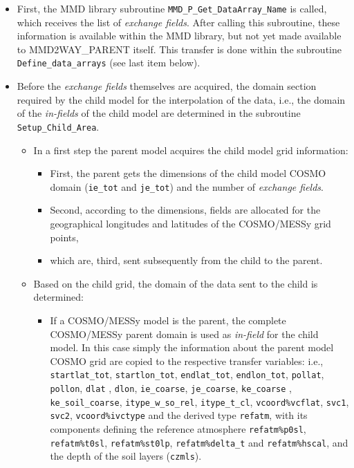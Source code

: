 \documentclass[11pt,twoside]{article}
\begin{document}
\begin{itemize} %

\item First, the MMD library subroutine
\verb|MMD_P_Get_DataArray_Name| is called, which receives the list of {\it 
exchange fields}. After calling this subroutine, these information is
available within the MMD 
library, but not yet made available to MMD2WAY\_PARENT itself. 
This transfer is done within the subroutine \verb|Define_data_arrays| 
(see last item below).

\item
Before the {\it exchange fields} themselves are acquired,
the domain section required by the child model for the interpolation of the
data,  
i.e., the domain of the {\it in-fields} of the child model are determined in the
subroutine \verb|Setup_Child_Area|.
\begin{itemize} %
\item In a first step the parent model acquires the child model grid information:
\begin{itemize} %
\item First, the parent gets the 
dimensions of the child model COSMO domain (\verb|ie_tot| and \verb|je_tot|)
 and the 
 number of {\it exchange fields}.
\item Second, according to the dimensions, fields are allocated for the 
geographical longitudes and latitudes of the COSMO/MESSy grid points,
\item which are, third, sent subsequently from the child to the parent.
\end{itemize} %

\item Based on the child grid, the domain of the data sent to the child
is determined:
\begin{itemize} %
\item If a COSMO/MESSy model is the parent, the complete COSMO/MESSy
parent domain is used as {\it in-field} for the child model. In this
case simply the information about the parent model COSMO grid are copied to the
respective transfer variables: i.e., \verb|startlat_tot|, \verb|startlon_tot|, 
\verb|endlat_tot|, \verb|endlon_tot|, \verb|pollat|, \verb|pollon|, \verb|dlat|
, \verb|dlon|, \verb|ie_coarse|, \verb|je_coarse|, \verb|ke_coarse|
, \verb|ke_soil_coarse|, \verb|itype_w_so_rel|, \verb|itype_t_cl|, 
\verb|vcoord%vcflat|, \verb|svc1|, \verb|svc2|, \verb|vcoord%ivctype|
and the derived type \verb|refatm|, with its components defining the reference
atmosphere \verb|refatm%p0sl|, \verb|refatm%t0sl|, \verb|refatm%st0lp|, 
\verb|refatm%delta_t| and \verb|refatm%hscal|,  
 and the depth of the soil layers (\verb|czmls|).


\end{itemize}
\end{itemize}
\end{itemize}
\end{document}
